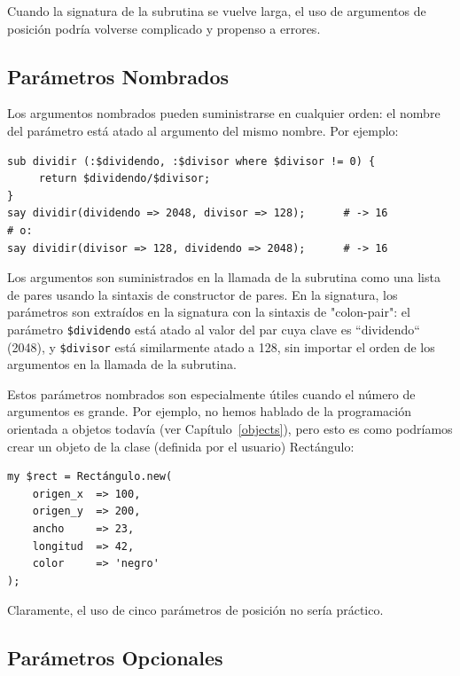Cuando la signatura de la subrutina se vuelve larga, el uso de 
argumentos de posición podría volverse complicado y propenso a
errores.

\subsection{Parámetros Nombrados}

Los argumentos nombrados pueden suministrarse en cualquier orden:
el nombre del parámetro está atado al argumento del mismo nombre.
Por ejemplo:

\begin{verbatim}
sub dividir (:$dividendo, :$divisor where $divisor != 0) {
     return $dividendo/$divisor;
}
say dividir(dividendo => 2048, divisor => 128);      # -> 16
# o:
say dividir(divisor => 128, dividendo => 2048);      # -> 16
\end{verbatim}

Los argumentos son suministrados en la llamada de la subrutina como una
lista de pares usando la sintaxis de constructor de pares. En la signatura,
los parámetros son extraídos en la signatura con la sintaxis de "colon-pair":
el parámetro \verb|$dividendo| está atado al valor del par cuya clave es 
``dividendo`` (2048), y \verb|$divisor| está similarmente atado a 128, 
sin importar el orden de los argumentos en la llamada de la subrutina.

Estos parámetros nombrados son especialmente útiles cuando el número de
argumentos es grande. Por ejemplo, no hemos hablado de la programación
orientada a objetos todavía (ver Capítulo~\ref{objects}), pero esto es como
podríamos crear un objeto de la clase (definida por el usuario) Rectángulo:

\begin{verbatim}
my $rect = Rectángulo.new( 
    origen_x  => 100, 
    origen_y  => 200, 
    ancho     => 23,
    longitud  => 42,
    color     => 'negro'
);
\end{verbatim}

Claramente, el uso de cinco parámetros de posición no sería práctico.

\subsection{Parámetros Opcionales}

